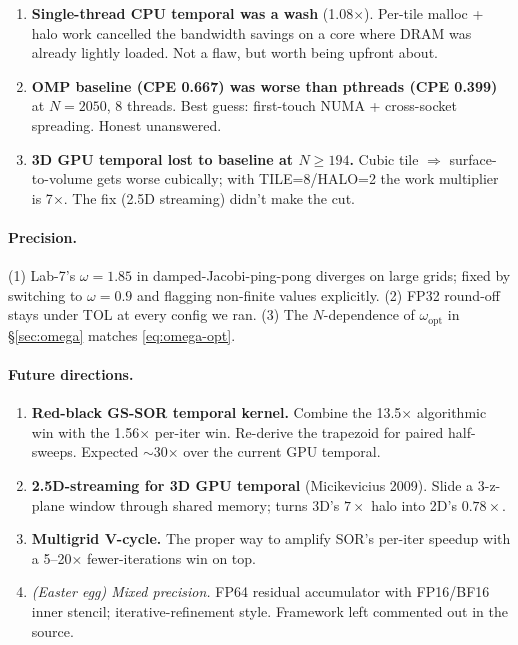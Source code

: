 \documentclass[11pt]{article}
\begin{document}
\begin{enumerate}[leftmargin=1.4em,itemsep=2pt,topsep=2pt]
  \item \textbf{Single-thread CPU temporal was a wash} (1.08$\times$).
        Per-tile malloc + halo work cancelled the bandwidth savings on
        a core where DRAM was already lightly loaded. Not a flaw, but
        worth being upfront about.
  \item \textbf{OMP baseline (CPE 0.667) was worse than pthreads
        (CPE 0.399)} at $N{=}2050$, 8 threads. Best guess: first-touch
        NUMA + cross-socket spreading. Honest unanswered.
  \item \textbf{3D GPU temporal lost to baseline at $N{\geq}194$.}
        Cubic tile $\Rightarrow$ surface-to-volume gets worse
        cubically; with TILE=8/HALO=2 the work multiplier is
        7$\times$. The fix (2.5D streaming) didn't make the cut.
\end{enumerate}

\paragraph{Precision.} (1) Lab-7's $\omega{=}1.85$ in
damped-Jacobi-ping-pong diverges on large grids; fixed by switching
to $\omega{=}0.9$ and flagging non-finite values explicitly. (2) FP32
round-off stays under TOL at every config we ran. (3) The
$N$-dependence of $\omega_{\text{opt}}$ in §\ref{sec:omega} matches
\eqref{eq:omega-opt}.

\paragraph{Future directions.}

\begin{enumerate}[leftmargin=1.4em,itemsep=2pt,topsep=2pt]
  \item \textbf{Red-black GS-SOR temporal kernel.} Combine the
        13.5$\times$ algorithmic win with the 1.56$\times$ per-iter
        win. Re-derive the trapezoid for paired half-sweeps. Expected
        $\sim$30$\times$ over the current GPU temporal.
  \item \textbf{2.5D-streaming for 3D GPU temporal} (Micikevicius
        2009). Slide a 3-z-plane window through shared memory; turns
        3D's $7\times$ halo into 2D's $0.78\times$.
  \item \textbf{Multigrid V-cycle.} The proper way to amplify SOR's
        per-iter speedup with a 5--20$\times$ fewer-iterations win on
        top.
  \item \textit{(Easter egg) Mixed precision.} FP64 residual
        accumulator with FP16/BF16 inner stencil; iterative-refinement
        style. Framework left commented out in the source.
\end{enumerate}
\end{document}
